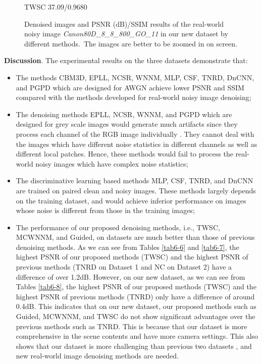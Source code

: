 \begin{figure}
{\begin{minipage}[t]{0.24\textwidth}
{\footnotesize TWSC 37.09/0.9680}
\end{minipage}
}\vspace{-3mm}
\caption{Denoised images and PSNR (dB)/SSIM results of the real-world noisy image \textsl{Canon80D\_8\_8\_800\_GO\_11} in our new dataset by different methods.\ The images are better to be zoomed in on screen.}
    \label{fig6-7}
\end{figure}


\textbf{Discussion}. 
The experimental results on the three datasets demonstrate that:
\begin{itemize}
\item The methods CBM3D, EPLL, NCSR, WNNM, MLP, CSF, TNRD, DnCNN, and PGPD which are designed for AWGN achieve lower PSNR and SSIM compared with the methods developed for real-world noisy image denoising;

\item The denoising methods EPLL, NCSR, WNNM, and PGPD which are designed for grey scale images would generate much artifacts since they process each channel of the RGB image individually \cite{srcolor}. They cannot deal with the images which have different noise statistics in different channels as well as different local patches. Hence, these methods would fail to process the real-world noisy images which have complex noise statistics;

\item The discriminative learning based methods MLP, CSF, TNRD, and DnCNN are trained on paired clean and noisy images. These methods largely depends on the training dataset, and would achieve inferior performance on images whose noise is different from those in the training images;

\item The performance of our proposed denoising methods, i.e., TWSC, MCWNNM, and Guided, on datasets \cite{crosschannel2016,dnd2017} are much better than those of previous denoising methods. As we can see from Tables \ref{tab6-6} and \ref{tab6-7}, the highest PSNR of our proposed methods (TWSC) and the highest PSNR of previous methods (TNRD on Dataset 1 and NC on Dataset 2) have a difference of over 1.2dB. However, on our new dataset, as we can see from Tables \ref{tab6-8}, the highest PSNR of our proposed methods (TWSC) and the highest PSNR of previous methods (TNRD) only have a difference of around 0.4dB. This indicates that on our new dataset, our proposed methods such as Guided, MCWNNM, and TWSC do not show significant advantages over the previous methods such as TNRD. This is because that our dataset is more comprehensive in the scene contents and have more camera settings. This also shows that our dataset is more challenging than previous two datasets \cite{crosschannel2016,dnd2017}, and new real-world image denoising methods are needed.
  
\end{itemize}



